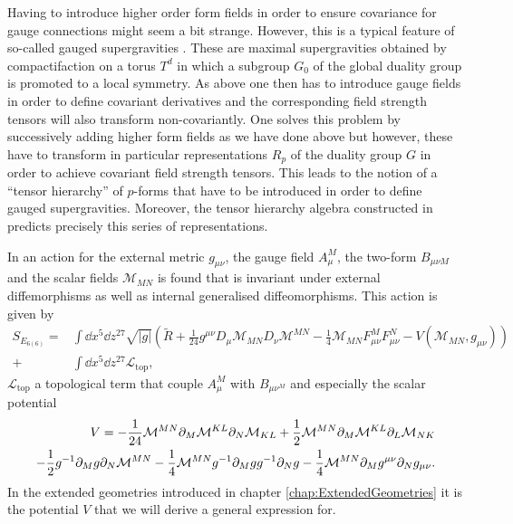 Having to introduce higher order form fields in order to ensure covariance for gauge connections might seem a bit strange. However, this is a typical feature of so-called gauged supergravities \cite{deWitTensorHierarchies2008}. These are maximal supergravities obtained by compactifaction on a torus $T^d$ in which a subgroup $G_0$ of the global duality group is promoted to a local symmetry. As above one then has to introduce gauge fields in order to define covariant derivatives and the corresponding field strength tensors will also transform non-covariantly. One solves this problem by successively adding higher form fields as we have done above but however, these have to transform in particular representations $R_p$ of the duality group $G$ in order to achieve covariant field strength tensors. This leads to the notion of a ``tensor hierarchy'' of $p$-forms that have to be introduced in order to define gauged supergravities. Moreover, the tensor hierarchy algebra constructed in \cite{Palmkvist:2013vya} predicts precisely this series of representations.

In \cite{E62014} an action for the external metric $g_{\mu\nu}$, the gauge field $A^M_\mu$, the two-form $B_{\mu\nu M}$ and the scalar fields $\mathcal{M}_{MN}$ is found that is invariant under external diffemorphisms as well as internal generalised diffeomorphisms. This action is given by 
\begin{equation}\label{eq:E6Action}\begin{aligned}
    S_{E_{6(6)}} = &\int \dd x^5\dd z^{27} \sqrt{|g|}\left(\tilde{R}+\frac{1}{24}g^{\mu\nu}D_\mu \mathcal{M}_{MN}D_\nu\mathcal{M}^{MN}-\frac{1}{4}\mathcal{M}_{MN}F^M_{\mu\nu}F^N_{\mu\nu}-V(\mathcal{M}_{MN},g_{\mu\nu})\right)\\
    +&\int \dd x^5\dd z^{27}\mathcal{L}_{\text{top}},
    \end{aligned}
\end{equation}
$\mathcal{L}_{\text{top}}$ a topological term that couple $A_\mu^M$ with $B_{\mu\nu^M}$ and especially the scalar potential 
\begin{equation}
    \begin{aligned}
    V = -\frac{1}{24}\mathcal{M}^{MN}\partial_M\mathcal{M}^{KL}\partial_N\mathcal{M}_{KL}+\frac{1}{2}\mathcal{M}^{MN}\partial_M\mathcal{M}^{KL}\partial_L\mathcal{M}_{NK}\\
    -\frac{1}{2}g^{-1}\partial_M g\partial_N\mathcal{M}^{MN}-\frac{1}{4}\mathcal{M}^{MN}g^{-1}\partial_Mgg^{-1}\partial_Ng-\frac{1}{4}\mathcal{M}^{MN}\partial_Mg^{\mu\nu}\partial_Ng_{\mu\nu}. 
    \end{aligned}
\end{equation}
In the extended geometries introduced in chapter \ref{chap:ExtendedGeometries} it is the potential $V$ that we will derive a general expression for. 


